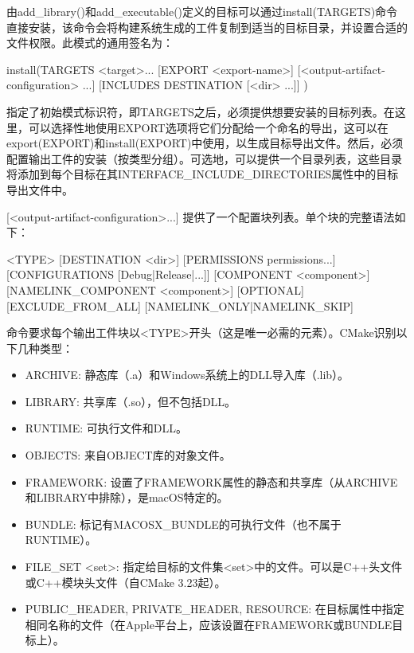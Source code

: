 
由add\_library()和add\_executable()定义的目标可以通过install(TARGETS)命令直接安装，该命令会将构建系统生成的工件复制到适当的目标目录，并设置合适的文件权限。此模式的通用签名为：

\begin{shell}
install(TARGETS <target>... [EXPORT <export-name>]
        [<output-artifact-configuration> ...]
        [INCLUDES DESTINATION [<dir> ...]]
)
\end{shell}

指定了初始模式标识符，即TARGETS之后，必须提供想要安装的目标列表。在这里，可以选择性地使用EXPORT选项将它们分配给一个命名的导出，这可以在export(EXPORT)和install(EXPORT)中使用，以生成目标导出文件。然后，必须配置输出工件的安装（按类型分组）。可选地，可以提供一个目录列表，这些目录将添加到每个目标在其INTERFACE\_INCLUDE\_DIRECTORIES属性中的目标导出文件中。

[<output-artifact-configuration>...] 提供了一个配置块列表。单个块的完整语法如下：

\begin{shell}
<TYPE> [DESTINATION <dir>]
       [PERMISSIONS permissions...]
       [CONFIGURATIONS [Debug|Release|...]]
       [COMPONENT <component>]
       [NAMELINK_COMPONENT <component>]
       [OPTIONAL] [EXCLUDE_FROM_ALL]
       [NAMELINK_ONLY|NAMELINK_SKIP]
\end{shell}

命令要求每个输出工件块以<TYPE>开头（这是唯一必需的元素）。CMake识别以下几种类型：

\begin{itemize}
\item
ARCHIVE: 静态库（.a）和Windows系统上的DLL导入库（.lib）。

\item
LIBRARY: 共享库（.so），但不包括DLL。

\item
RUNTIME: 可执行文件和DLL。

\item
OBJECTS: 来自OBJECT库的对象文件。

\item
FRAMEWORK: 设置了FRAMEWORK属性的静态和共享库（从ARCHIVE和LIBRARY中排除），是macOS特定的。

\item
BUNDLE: 标记有MACOSX\_BUNDLE的可执行文件（也不属于RUNTIME）。

\item
FILE\_SET <set>: 指定给目标的文件集<set>中的文件。可以是C++头文件或C++模块头文件（自CMake 3.23起）。

\item
PUBLIC\_HEADER, PRIVATE\_HEADER, RESOURCE: 在目标属性中指定相同名称的文件（在Apple平台上，应该设置在FRAMEWORK或BUNDLE目标上）。
\end{itemize}

